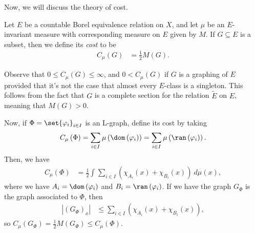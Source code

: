 \documentclass[10pt]{mypackage}
\begin{document}
Now, we will discuss the theory of cost.
\begin{definition}
  Let $E$ be a countable Borel equivalence relation on $X$, and let $\mu$ be an $E$-invariant measure with corresponding measure on $E$ given by $M$. If $G\subseteq E$ is a subset, then we define its \textit{cost} to be
  \begin{align*}
    C_{\mu} \left( G \right) &= \frac{1}{2}M\left( G \right).
  \end{align*}
\end{definition}
Observe that $0\leq C_{\mu}\left( G \right) \leq \infty$, and $0 < C_{\mu}\left( G \right)$ if $G$ is a graphing of $E$ provided that it's not the case that almost every $E$-class is a singleton. This follows from the fact that $G$ is a complete section for the relation $ \widetilde{E} $ on $E$, meaning that $M(G) > 0$.

Now, if $\Phi = \set{\varphi_i}_{i\in I}$ is an L-graph, define its cost by taking
\begin{align*}
  C_{\mu}\left( \Phi \right) = \sum_{i\in I}\mu\left( \dom\left( \varphi_i \right) \right) = \sum_{i\in I}\mu\left( \ran\left( \varphi_i \right) \right).
\end{align*}
Then, we have
\begin{align*}
  C_{\mu}\left( \Phi \right) &= \frac{1}{2} \int_{}^{} \sum_{i\in I}\left( \chi_{A_i}(x) + \chi_{B_i}(x) \right)\:d\mu(x),
\end{align*}
where we have $A_i = \dom\left( \varphi_i \right)$ and $B_i = \ran\left( \varphi_i \right)$. If we have the graph $ G_{\Phi} $ is the graph associated to $\Phi$, then
\begin{align*}
  \left\vert \left( G_{\Phi} \right)_x \right\vert &\leq \sum_{i\in I} \left( \chi_{A_i}(x) + \chi_{B_i}(x) \right),
\end{align*}
so $C_{\mu}\left( G_{\Phi} \right) = \frac{1}{2}M\left( G_{\Phi} \right)\leq C_{\mu}\left( \Phi \right)$.
\end{document}

